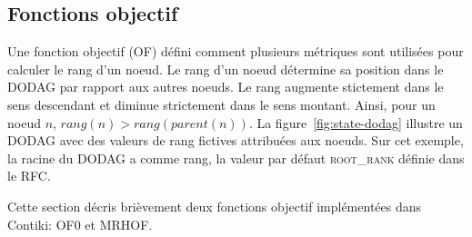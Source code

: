 \subsection*{Fonctions objectif}
Une fonction objectif (OF) défini comment plusieurs métriques sont utilisées pour calculer le rang d'un noeud. Le rang d'un noeud détermine sa position dans le DODAG par rapport aux autres noeuds.
Le rang augmente stictement dans le sens descendant et diminue strictement dans le sens montant. Ainsi, pour un noeud $n$, $rang(n)>rang(parent(n))$. La figure~\ref{fig:state-dodag} illustre un DODAG avec des valeurs de rang fictives attribuées aux noeuds. Sur cet exemple, la racine du DODAG a comme rang, la valeur par défaut \textsc{root\_rank} définie dans le RFC.

Cette section décris brièvement deux fonctions objectif implémentées dans Contiki: OF0 et MRHOF.
